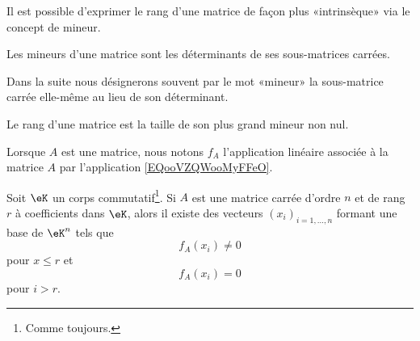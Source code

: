 Il est possible d'exprimer le rang d'une matrice de façon plus «intrinsèque» via le concept de mineur.
\begin{definition}
    Les mineurs d'une matrice sont les déterminants de ses sous-matrices carrées.
\end{definition}
Dans la suite nous désignerons souvent par le mot «mineur» la sous-matrice carrée elle-même au lieu de son déterminant.

\begin{proposition}      \label{DEFooVVBYooJbliTi}
    Le rang d'une matrice est la taille de son plus grand mineur non nul.
\end{proposition}

Lorsque \( A\) est une matrice, nous notons \( f_A\) l'application linéaire associée à la matrice \( A\) par l'application \eqref{EQooVZQWooMyFFeO}.
\begin{lemma} \label{LEMVecsaRgFixe}
    Soit \( \eK \) un corps commutatif\footnote{Comme toujours.}. Si \( A \) est une matrice carrée d'ordre \( n \) et de rang \( r \) à coefficients dans \( \eK \), alors il existe des vecteurs \( (x_i)_{i=1,\dots,n} \) formant une base de \( \eK^n \) tels que 
    \begin{equation}
        f_A(x_i)\neq 0
    \end{equation}
    pour \( x\leq r\) et
    \begin{equation}
        f_A(x_i) = 0
    \end{equation}
    pour \( i > r \).
\end{lemma}

